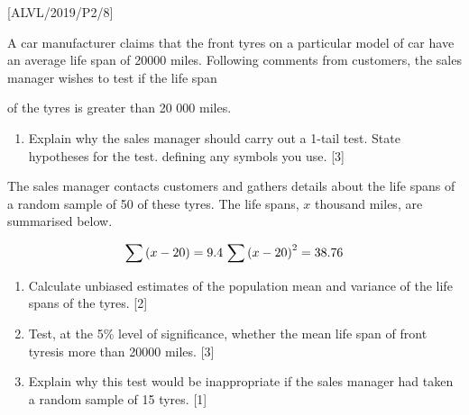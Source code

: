 \item {[}ALVL/2019/P2/8{]} 

A car manufacturer claims that the front tyres on a particular model
of car have an average life span of 20000 miles. Following comments
from customers, the sales manager wishes to test if the life span

of the tyres is greater than 20 000 miles.
\begin{enumerate}
\item Explain why the sales manager should carry out a 1-tail test. State
hypotheses for the test. defining any symbols you use. \hfill{}{[}3{]}
\end{enumerate}
The sales manager contacts customers and gathers details about the
life spans of a random sample of 50 of these tyres. The life spans,
$x$ thousand miles, are summarised below.

\[
\sum\left(x-20\right)=9.4\,\,\text{\ensuremath{\sum\left(x-20\right)^{2}=38.76}}
\]

\begin{enumerate}
\item Calculate unbiased estimates of the population mean and variance of
the life spans of the tyres. \hfill{}{[}2{]}
\item Test, at the 5\% level of significance, whether the mean life span
of front tyresis more than 20000 miles. \hfill{}{[}3{]}
\item Explain why this test would be inappropriate if the sales manager
had taken a random sample of 15 tyres. \hfill{}{[}1{]}
\end{enumerate}
